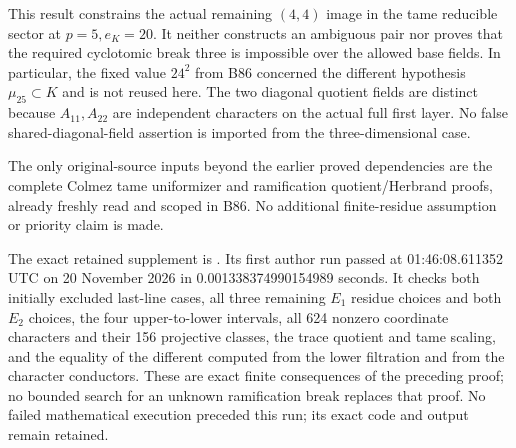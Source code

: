 \begin{remark}
\label{rem:B-RD88-scope}
This result constrains the actual remaining \((4,4)\)
image in the tame reducible sector at \(p=5,e_K=20\).
It neither constructs an ambiguous pair nor proves that
the required cyclotomic break three is impossible over
the allowed base fields. In particular, the fixed value
\(24^2\) from B86 concerned the different hypothesis
\(\mu_{25}\subset K\) and is not reused here.
The two diagonal quotient fields are distinct because
\(A_{11},A_{22}\) are independent characters on the
actual full first layer. No false shared-diagonal-field
assertion is imported from the three-dimensional case.

The only original-source inputs beyond the earlier
proved dependencies are the complete Colmez tame
uniformizer and ramification quotient/Herbrand proofs,
already freshly read and scoped in B86. No additional
finite-residue assumption or priority claim is made.

The exact retained supplement is
.
Its first author run passed at 01:46:08.611352 UTC
on 20 November 2026 in 0.001338374990154989 seconds.
It checks both initially excluded last-line cases,
all three remaining \(E_1\) residue choices and both
\(E_2\) choices, the four upper-to-lower intervals,
all 624 nonzero coordinate characters and their
156 projective classes, the trace quotient and tame
scaling, and the equality of the different computed
from the lower filtration and from the character
conductors. These are exact finite consequences of
the preceding proof; no bounded search for an
unknown ramification break replaces that proof.
No failed mathematical execution preceded this run;
its exact code and output remain retained.
\end{remark}
